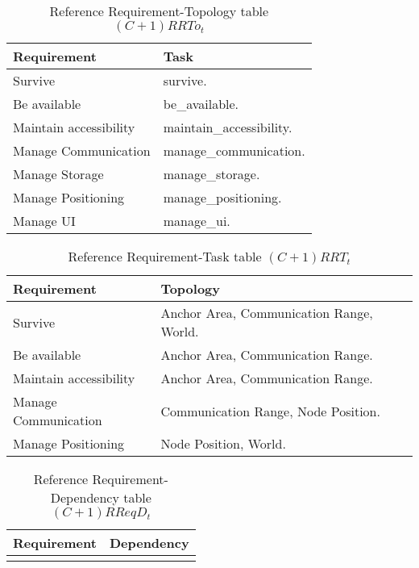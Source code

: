 \begin{table}[H]
	\centering
	\begin{tabular}{|p{4cm}|p{8cm}|}
			\hline
			\textbf{Requirement} & \textbf{Task} \\
			\hline
			Survive & survive. \\
			\hline
			Be available & be\_available. \\
			\hline
			Maintain accessibility & maintain\_accessibility. \\
			\hline
			Manage Communication & manage\_communication. \\
			\hline
			Manage Storage & manage\_storage. \\
			\hline
			Manage Positioning & manage\_positioning. \\
			\hline
			Manage UI & manage\_ui. \\
			\hline
		\end{tabular}
	\caption{Reference Requirement-Topology table $(C+1)RRTo_t$}
	\label{tab:cp1rrtot}
\end{table}

\begin{table}[H]
	\centering
	\begin{tabular}{|p{4cm}|p{8cm}|}
			\hline
			\textbf{Requirement} & \textbf{Topology} \\
			\hline
			Survive & Anchor Area, Communication Range, World. \\
			\hline
			Be available & Anchor Area, Communication Range. \\
			\hline
			Maintain accessibility & Anchor Area, Communication Range. \\
			\hline
			Manage Communication & Communication Range, Node Position. \\
			\hline
			Manage Positioning & Node Position, World. \\
			\hline
		\end{tabular}
	\caption{Reference Requirement-Task table $(C+1)RRT_t$}
	\label{tab:cp1rrtt}
\end{table}

\begin{table}[H]
	\centering
	\begin{tabular}{|p{4cm}|p{8cm}|}
			\hline
			\textbf{Requirement} & \textbf{Dependency} \\
			\hline
			 & \\
			\hline
		\end{tabular}
		\caption{Reference Requirement-Dependency table $(C+1)RReqD_t$}
	\label{tab:cp1rreqdt}
\end{table}

